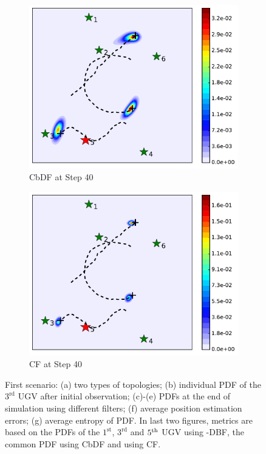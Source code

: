 \begin{figure}
\begin{subfigure}[b]{0.23\textwidth}
			\includegraphics[width=\textwidth]{figures/cons_hetero_mov_sen_mov_tar_rbt5_step40}
			\caption{CbDF at Step 40}\label{fig:cbdf_step40}
		\end{subfigure}	
		\begin{subfigure}[b]{0.23\textwidth}
			\includegraphics[width=\textwidth]{figures/cent_hetero_mov_sen_mov_tar_rbt1_step40}
			\caption{CF at Step 40}\label{fig:cf_step40}
		\end{subfigure}
		\caption{First scenario: (a) two types of topologies; (b) individual PDF of the $3^\text{rd}$ UGV after initial observation; (c)-(e) PDFs at the end of simulation using different filters; (f) average position estimation errors; (g) average entropy of PDF. In last two figures, metrics are based on the PDFs of the $1^\text{st}$, $3^\text{rd}$ and $5^\text{th}$ UGV using \proto-DBF, the common PDF using CbDF and using CF.}
		\label{fig:mov_sen_mov_tar1}
	\end{figure}
	
